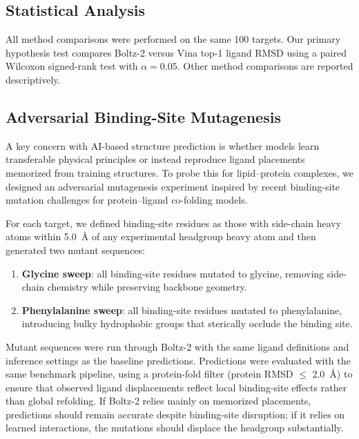 \documentclass[journal=jcisd8,manuscript=article]{achemso}
\begin{document}
\subsection{Statistical Analysis}

All method comparisons were performed on the same 100 targets.
Our primary hypothesis test compares Boltz-2 versus Vina top-1 ligand RMSD using a paired Wilcoxon signed-rank test with $\alpha = 0.05$.
Other method comparisons are reported descriptively.

\subsection{Adversarial Binding-Site Mutagenesis}

A key concern with AI-based structure prediction is whether models learn transferable physical principles or instead reproduce ligand placements memorized from training structures.\cite{masters2025physics}
To probe this for lipid--protein complexes, we designed an adversarial mutagenesis experiment inspired by recent binding-site mutation challenges for protein--ligand co-folding models.\cite{masters2025physics}

For each target, we defined binding-site residues as those with side-chain heavy atoms within \SI{5.0}{\angstrom} of any experimental headgroup heavy atom and then generated two mutant sequences:
\begin{enumerate}
    \item \textbf{Glycine sweep}: all binding-site residues mutated to glycine, removing side-chain chemistry while preserving backbone geometry.
    \item \textbf{Phenylalanine sweep}: all binding-site residues mutated to phenylalanine, introducing bulky hydrophobic groups that sterically occlude the binding site.
\end{enumerate}

Mutant sequences were run through Boltz-2 with the same ligand definitions and inference settings as the baseline predictions.
Predictions were evaluated with the same benchmark pipeline, using a protein-fold filter (protein RMSD $\leq$ \SI{2.0}{\angstrom}) to ensure that observed ligand displacements reflect local binding-site effects rather than global refolding.
If Boltz-2 relies mainly on memorized placements, predictions should remain accurate despite binding-site disruption; if it relies on learned interactions, the mutations should displace the headgroup substantially.
\end{document}
